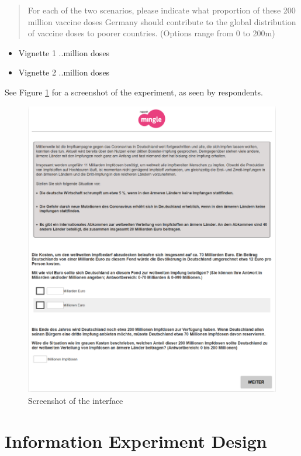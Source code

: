 \documentclass[]{article}
\begin{document}
\begin{quote}
	For each of the two scenarios, please indicate what proportion of these
	200 million vaccine doses Germany should contribute to the global
	distribution of vaccine doses to poorer countries. (Options range from 0
	to 200m)
\end{quote}

\begin{itemize}
	\item
	Vignette 1 ..million doses
	\item
	Vignette 2 ..million doses
\end{itemize}

See Figure \ref{fig:screen} for a screenshot of the experiment, as seen by respondents.

\begin{figure}[hbt!]
	\includegraphics[width=\linewidth]{../Figures/Experiment_8.png}
	\caption{Screenshot of the interface}
	\label{fig:screen}
\end{figure}




\clearpage
\section{Information Experiment Design}
\end{document}
